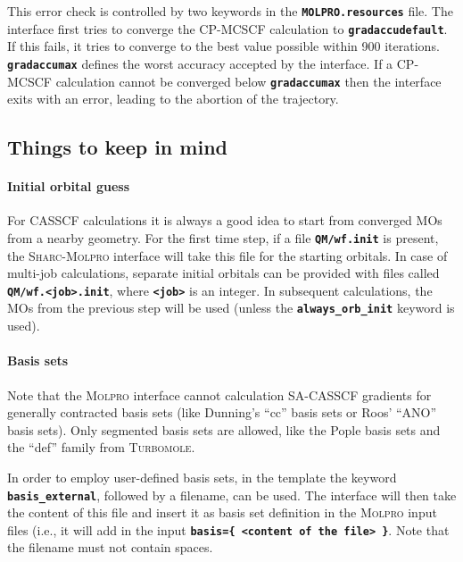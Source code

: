 \documentclass[a4paper,10pt,DIV=15,openany]{scrbook}
\newcommand{\sharc}{\textsc{Sharc}}
\newcommand{\ttt}[1]{\textbf{\texttt{#1}}}
\begin{document}
This error check is controlled by two keywords in the \ttt{MOLPRO.resources} file. The interface first tries to converge the CP-MCSCF calculation to \ttt{gradaccudefault}. If this fails, it tries to converge to the best value possible within 900 iterations. \ttt{gradaccumax} defines the worst accuracy accepted by the interface. If a CP-MCSCF calculation cannot be converged below \ttt{gradaccumax} then the interface exits with an error, leading to the abortion of the trajectory.

\subsection{Things to keep in mind}

\paragraph{Initial orbital guess}

For CASSCF calculations it is always a good idea to start from converged MOs from a nearby geometry. For the first time step, if a file \ttt{QM/wf.init} is present, the \sharc-\textsc{Molpro} interface will take this file for the starting orbitals. In case of multi-job calculations, separate initial orbitals can be provided with files called \ttt{QM/wf.<job>.init}, where \ttt{<job>} is an integer.
In subsequent calculations, the MOs from the previous step will be used (unless the \ttt{always\_orb\_init} keyword is used).

\paragraph{Basis sets}

Note that the \textsc{Molpro} interface cannot calculation SA-CASSCF gradients for generally contracted basis sets (like Dunning's ``cc'' basis sets or Roos' ``ANO'' basis sets). Only segmented basis sets are allowed, like the Pople basis sets and the ``def'' family from \textsc{Turbomole}.

In order to employ user-defined basis sets, in the template the keyword \ttt{basis\_external}, followed by a filename, can be used.
The interface will then take the content of this file and insert it as basis set definition in the \textsc{Molpro} input files (i.e., it will add in the input \ttt{basis=\{ <content of the file> \}}.
Note that the filename must not contain spaces.
\end{document}
